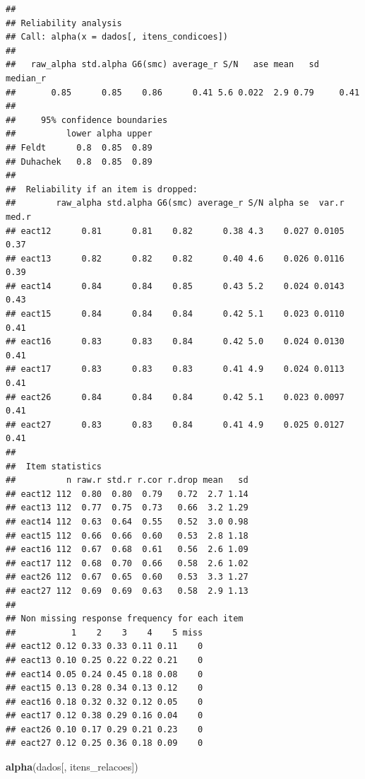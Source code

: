 \documentclass[
]{article}
\newenvironment{Shaded}{\begin{snugshade}}{\end{snugshade}}
\newcommand{\FunctionTok}[1]{\textcolor[rgb]{0.13,0.29,0.53}{\textbf{#1}}}
\newcommand{\NormalTok}[1]{#1}
\begin{document}
\begin{verbatim}
## 
## Reliability analysis   
## Call: alpha(x = dados[, itens_condicoes])
## 
##   raw_alpha std.alpha G6(smc) average_r S/N   ase mean   sd median_r
##       0.85      0.85    0.86      0.41 5.6 0.022  2.9 0.79     0.41
## 
##     95% confidence boundaries 
##          lower alpha upper
## Feldt      0.8  0.85  0.89
## Duhachek   0.8  0.85  0.89
## 
##  Reliability if an item is dropped:
##        raw_alpha std.alpha G6(smc) average_r S/N alpha se  var.r med.r
## eact12      0.81      0.81    0.82      0.38 4.3    0.027 0.0105  0.37
## eact13      0.82      0.82    0.82      0.40 4.6    0.026 0.0116  0.39
## eact14      0.84      0.84    0.85      0.43 5.2    0.024 0.0143  0.43
## eact15      0.84      0.84    0.84      0.42 5.1    0.023 0.0110  0.41
## eact16      0.83      0.83    0.84      0.42 5.0    0.024 0.0130  0.41
## eact17      0.83      0.83    0.83      0.41 4.9    0.024 0.0113  0.41
## eact26      0.84      0.84    0.84      0.42 5.1    0.023 0.0097  0.41
## eact27      0.83      0.83    0.84      0.41 4.9    0.025 0.0127  0.41
## 
##  Item statistics 
##          n raw.r std.r r.cor r.drop mean   sd
## eact12 112  0.80  0.80  0.79   0.72  2.7 1.14
## eact13 112  0.77  0.75  0.73   0.66  3.2 1.29
## eact14 112  0.63  0.64  0.55   0.52  3.0 0.98
## eact15 112  0.66  0.66  0.60   0.53  2.8 1.18
## eact16 112  0.67  0.68  0.61   0.56  2.6 1.09
## eact17 112  0.68  0.70  0.66   0.58  2.6 1.02
## eact26 112  0.67  0.65  0.60   0.53  3.3 1.27
## eact27 112  0.69  0.69  0.63   0.58  2.9 1.13
## 
## Non missing response frequency for each item
##           1    2    3    4    5 miss
## eact12 0.12 0.33 0.33 0.11 0.11    0
## eact13 0.10 0.25 0.22 0.22 0.21    0
## eact14 0.05 0.24 0.45 0.18 0.08    0
## eact15 0.13 0.28 0.34 0.13 0.12    0
## eact16 0.18 0.32 0.32 0.12 0.05    0
## eact17 0.12 0.38 0.29 0.16 0.04    0
## eact26 0.10 0.17 0.29 0.21 0.23    0
## eact27 0.12 0.25 0.36 0.18 0.09    0
\end{verbatim}

\begin{Shaded}
\begin{Highlighting}[]
\FunctionTok{alpha}\NormalTok{(dados[, itens\_relacoes])}
\end{Highlighting}
\end{Shaded}
\end{document}
